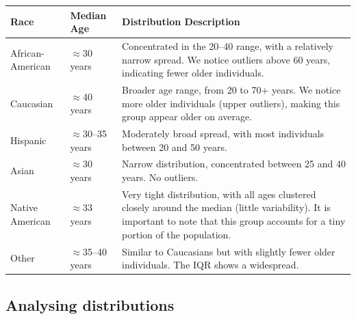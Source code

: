 \begin{table}[H]
	\centering
	\begin{tabular}{|l|l|p{4cm}|}
		\hline
		Race & Median Age & Distribution Description \\ \hline \hline
		African-American & $\approx$30 years & Concentrated in the 20–40 range, with a relatively narrow spread. We notice outliers above 60 years,  indicating fewer older individuals. \\ \hline
		Caucasian & $\approx$40 years & Broader age range, from 20 to 70+ years. We notice more older individuals (upper outliers), making this group appear older on average. \\ \hline
		Hispanic & $\approx$30–35 years & Moderately broad spread, with most individuals between 20 and 50 years. \\ \hline
		Asian & $\approx$30 years & Narrow distribution, concentrated between 25 and 40 years. No outliers. \\ \hline
		Native American & $\approx$33 years & Very tight distribution, with all ages clustered closely around the median (little variability). It is important to note that this group accounts for a tiny portion of the population. \\ \hline
		Other & $\approx$35–40 years & Similar to Caucasians but with slightly fewer older individuals. The IQR shows a widespread. \\ \hline
	\end{tabular}
\end{table}



\subsection{Analysing distributions}


